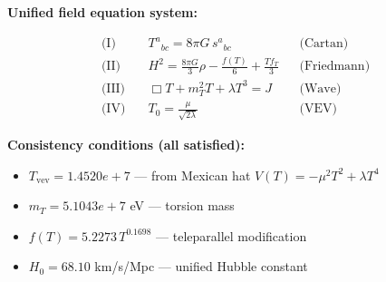 
\textbf{Unified field equation system:}

\begin{align}
  \text{(I)} \quad & T^a{}_{bc} = 8\pi G \, s^a{}_{bc} && \text{(Cartan)} \\
  \text{(II)} \quad & H^2 = \frac{8\pi G}{3}\rho - \frac{f(T)}{6} + \frac{Tf_T}{3} && \text{(Friedmann)} \\
  \text{(III)} \quad & \Box T + m_T^2 T + \lambda T^3 = J && \text{(Wave)} \\
  \text{(IV)} \quad & T_0 = \frac{\mu}{\sqrt{2\lambda}} && \text{(VEV)}
\end{align}

\textbf{Consistency conditions (all satisfied):}
\begin{itemize}
  \item $T_{\text{vev}} = 1.4520e+7$ — from Mexican hat $V(T) = -\mu^2 T^2 + \lambda T^4$
  \item $m_T = 5.1043e+7$ eV — torsion mass
  \item $f(T) = 5.2273 \, T^{0.1698}$ — teleparallel modification
  \item $H_0 = 68.10$ km/s/Mpc — unified Hubble constant
\end{itemize}